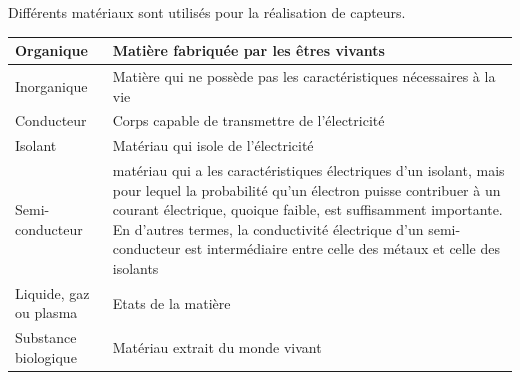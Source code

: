 Différents matériaux sont utilisés pour la réalisation de capteurs.

\begin {center}
\begin{tabular}{|p{4.2cm}|p{9.5cm}|}
    \hline
    Organique              & Matière fabriquée par les êtres vivants                                                                                                                                                                                                                                                                                                 \\
    \hline
    Inorganique            & Matière qui ne possède pas les caractéristiques nécessaires à la vie                                                                                                                                                                                                                                                                    \\
    \hline
    Conducteur             & Corps capable de transmettre de l'électricité                                                                                                                                                                                                                                                                                           \\
    \hline
    Isolant                & Matériau qui isole de l'électricité                                                                                                                                                                                                                                                                                                     \\
    \hline
    Semi-conducteur        & matériau qui a les caractéristiques électriques d'un isolant, mais pour lequel la probabilité qu'un électron puisse contribuer à un courant électrique, quoique faible, est suffisamment importante. En d'autres termes, la conductivité électrique d'un semi-conducteur est intermédiaire entre celle des métaux et celle des isolants \\
    \hline
    Liquide, gaz ou plasma & Etats de la matière                                                                                                                                                                                                                                                                                                                     \\
    \hline
    Substance biologique   & Matériau extrait du monde vivant                                                                                                                                                                                                                                                                                                        \\
    \hline
\end{tabular}
\end{center}

